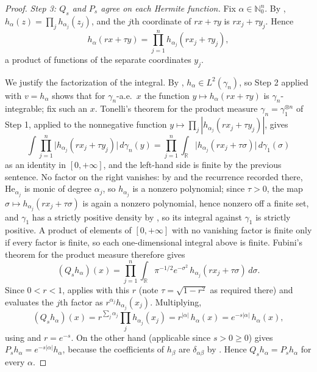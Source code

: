 \begin{proof}
\emph{Step 3: $Q_s$ and $P_s$ agree on each Hermite function.}
Fix $\alpha \in \mathbb{N}_0^n$.  By ,
$h_\alpha(z) = \prod_{j} h_{\alpha_j}(z_j)$, and the $j$th coordinate of
$rx+\tau y$ is $r x_j + \tau y_j$.  Hence
\[
  h_\alpha(rx+\tau y) = \prod_{j=1}^n h_{\alpha_j}(r x_j + \tau y_j),
\]
a product of functions of the separate coordinates $y_j$.

We justify the factorization of the integral.  By ,
$h_\alpha \in L^2(\gamma_n)$, so Step 2 applied with $v = h_\alpha$ shows that for
$\gamma_n$-a.e.\ $x$ the function $y \mapsto h_\alpha(rx+\tau y)$ is
$\gamma_n$-integrable; fix such an $x$.  Tonelli's theorem for the product measure
$\gamma_n = \gamma_1^{\otimes n}$ of Step 1, applied to the nonnegative function
$y \mapsto \prod_j |h_{\alpha_j}(rx_j+\tau y_j)|$, gives
\[
  \int \prod_{j=1}^n \bigl|h_{\alpha_j}(rx_j+\tau y_j)\bigr|\, d\gamma_n(y)
    = \prod_{j=1}^n \int_{\mathbb{R}} \bigl|h_{\alpha_j}(rx_j+\tau\sigma)\bigr|\,
        d\gamma_1(\sigma)
\]
as an identity in $[0,+\infty]$, and the left-hand side is finite by the previous
sentence.  No factor on the right vanishes: by  and the
recurrence recorded there, $\mathrm{He}_{\alpha_j}$ is monic of degree $\alpha_j$, so
$h_{\alpha_j}$ is a nonzero polynomial; since $\tau > 0$, the map
$\sigma \mapsto h_{\alpha_j}(rx_j+\tau\sigma)$ is again a nonzero polynomial, hence
nonzero off a finite set, and $\gamma_1$ has a strictly positive density by
, so its integral against $\gamma_1$ is strictly positive.
A product of elements of $[0,+\infty]$ with no vanishing factor is finite only if
every factor is finite, so each one-dimensional integral above is finite.
Fubini's theorem for the product measure therefore gives
\[
  (Q_s h_\alpha)(x)
    = \prod_{j=1}^n \int_{\mathbb{R}} \pi^{-1/2}e^{-\sigma^2}\,
        h_{\alpha_j}(r x_j + \tau \sigma)\, d\sigma .
\]
Since $0 < r < 1$,  applies with this $r$ (note
$\tau = \sqrt{1-r^2}$ as required there) and evaluates the $j$th factor as
$r^{\alpha_j} h_{\alpha_j}(x_j)$.  Multiplying,
\[
  (Q_s h_\alpha)(x)
    = r^{\sum_j \alpha_j}\prod_j h_{\alpha_j}(x_j)
    = r^{|\alpha|}\, h_\alpha(x)
    = e^{-s|\alpha|}\, h_\alpha(x),
\]
using  and $r = e^{-s}$.  On the other hand
 (applicable since $s > 0 \geq 0$) gives
$P_s h_\alpha = e^{-s|\alpha|}h_\alpha$, because the coefficients of $h_\beta$ are
$\delta_{\alpha\beta}$ by .  Hence
$Q_s h_\alpha = P_s h_\alpha$ for every $\alpha$.


\end{proof}

